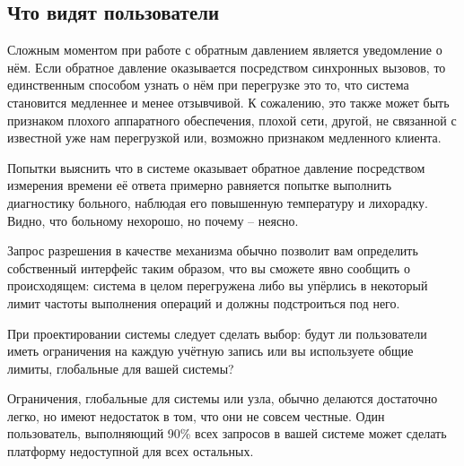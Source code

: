 \documentclass[11pt, oneside]{book}   	%
\begin{document}
\subsection{Что видят пользователи}

Сложным моментом при работе с обратным давлением является уведомление о нём. Если обратное давление оказывается посредством синхронных вызовов, то единственным способом узнать о нём при перегрузке это то, что система становится медленнее и менее отзывчивой. К сожалению, это также может быть признаком плохого аппаратного обеспечения, плохой сети, другой, не связанной с известной уже нам перегрузкой или, возможно признаком медленного клиента.

Попытки выяснить что в системе оказывает обратное давление посредством измерения времени её ответа примерно равняется попытке выполнить диагностику больного, наблюдая его повышенную температуру и лихорадку. Видно, что больному нехорошо, но почему -- неясно.

Запрос разрешения в качестве механизма обычно позволит вам определить собственный интерфейс таким образом, что вы сможете явно сообщить о происходящем: система в целом перегружена либо вы упёрлись в некоторый лимит частоты выполнения операций и должны подстроиться под него.

При проектировании системы следует сделать выбор: будут ли пользователи иметь ограничения на каждую учётную запись или вы используете общие лимиты, глобальные для вашей системы?

Ограничения, глобальные для системы или узла, обычно делаются достаточно легко, но имеют недостаток в том, что они не совсем честные. Один пользователь, выполняющий 90\% всех запросов в вашей системе может сделать платформу недоступной для всех остальных.
\end{document}
